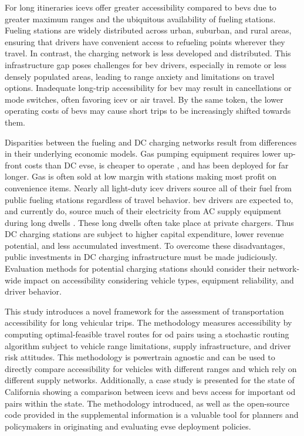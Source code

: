 For long itineraries \glspl{icev} offer greater accessibility compared to \glspl{bev} due to greater maximum ranges and the ubiquitous availability of fueling stations. Fueling stations are widely distributed across urban, suburban, and rural areas, ensuring that drivers have convenient access to refueling points wherever they travel. In contrast, the  charging network is less developed and distributed. This infrastructure gap poses challenges for \gls{bev} drivers, especially in remote or less densely populated areas, leading to range anxiety and limitations on travel options. Inadequate long-trip accessibility for \gls{bev} may result in cancellations or mode switches, often favoring \gls{icev} or air travel. By the same token, the lower operating costs of \glspl{bev} may cause short trips to be increasingly shifted towards them.

Disparities between the fueling and DC charging networks result from differences in their underlying economic models. Gas pumping equipment requires lower up-front costs than DC \gls{evse}, is cheaper to operate \cite{Gamage_2023}, and has been deployed for far longer. Gas is often sold at low margin with stations making most profit on convenience items. Nearly all light-duty \gls{icev} drivers source all of their fuel from public fueling stations regardless of travel behavior. \gls{bev} drivers are expected to, and currently do, source much of their electricity from AC supply equipment during long dwells \cite{Hardman_2018}. These long dwells often take place at private chargers. Thus DC charging stations are subject to higher capital expenditure, lower revenue potential, and less accumulated investment. To overcome these disadvantages, public investments in DC charging infrastructure must be made judiciously. Evaluation methods for potential charging stations should consider their network-wide impact on accessibility considering vehicle types, equipment reliability, and driver behavior.

This study introduces a novel framework for the assessment of transportation accessibility for long vehicular trips. The methodology measures accessibility by computing optimal-feasible travel routes for \gls{od} pairs using a stochastic routing algorithm subject to vehicle range limitations, supply infrastructure, and driver risk attitudes. This methodology is powertrain agnostic and can be used to directly compare accessibility for vehicles with different ranges and which rely on different supply networks. Additionally, a case study is presented for the state of California showing a comparison between \glspl{icev} and \glspl{bev} access for important \gls{od} pairs within the state. The methodology introduced, as well as the open-source code provided in the supplemental information is a valuable tool for planners and policymakers in originating and evaluating \gls{evse} deployment policies.